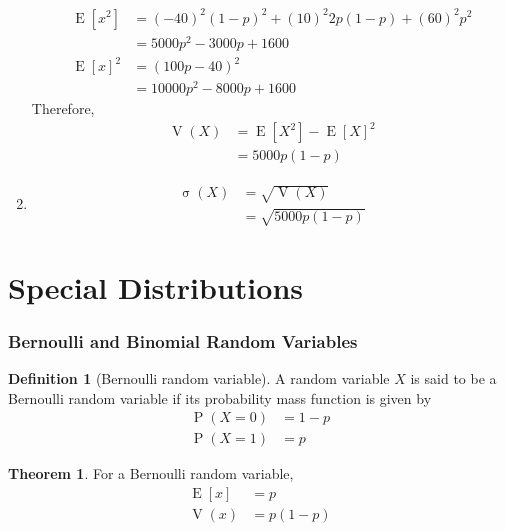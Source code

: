 \documentclass[titlepage, fleqn, a4paper, 12pt, twoside]{article}
\theoremstyle{definition}
\newtheorem{definition}{Definition}
\theoremstyle{theorem}
\newtheorem{theorem}{Theorem}
\DeclareMathOperator{\prob}{\mathrm{P}}
\DeclareMathOperator{\expct}{\mathrm{E}}
\DeclareMathOperator{\var}{\mathrm{V}}
\DeclareMathOperator{\sd}{\mathrm{\sigma}}
\begin{document}
\begin{solution}
\begin{enumerate}[leftmargin=*]
\begin{align*}
				\expct\left[ x^2 \right] & = (-40)^2 (1 - p)^2 + (10)^2 2 p (1 - p) + (60)^2 p^2 \\
                                                         & = 5000 p^2 - 3000 p + 1600                            \\
				\expct[x]^2              & = (100 p - 40)^2                                      \\
                                                         & = 10000 p^2 - 8000 p + 1600
			\end{align*}
			Therefore,
			\begin{align*}
				\var(X) & = \expct\left[ X^2 \right] - \expct[X]^2 \\
                                        & = 5000 p (1 - p)
			\end{align*}
		\item
			\begin{align*}
				\sd(X) & = \sqrt{\var(X)} \\
                                       & = \sqrt{5000 p (1 - p)}
			\end{align*}
	\end{enumerate}
\end{solution}

\clearpage
\part{Special Distributions}

\section{Bernoulli and Binomial Random Variables}

\begin{definition}[Bernoulli random variable]
	A random variable $X$ is said to be a Bernoulli random variable if its probability mass function is given by
	\begin{align*}
		\prob(X = 0) & = 1 - p \\
		\prob(X = 1) & = p
	\end{align*}
\end{definition}

\begin{theorem}
	For a Bernoulli random variable,
	\begin{align*}
		\expct[x] & = p \\
		\var(x)   & = p (1 - p)
	\end{align*}
\end{theorem}
\end{document}
